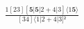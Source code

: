 \documentclass[varwidth, border=5pt]{standalone}
\begin{document}
\begin{my}
$\begin{gathered}
\scriptscriptstyle\frac{1[23][𝟓|𝟓|2+4|3]⟨1𝟓⟩}{[34]⟨1|2+4|3]²}
\end{gathered}$
\end{my}
\end{document}
